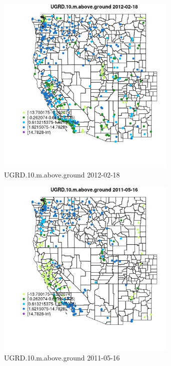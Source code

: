 \begin{figure} 
\centering  
\includegraphics[width=0.77\textwidth]{Code_Outputs/Report_ML_input_PM25_Step4_part_f_de_duplicated_aveswNAs_MapObsUGRD10maboveground2012-02-18.jpg} 
\caption{\label{fig:Report_ML_input_PM25_Step4_part_f_de_duplicated_aveswNAsMapObsUGRD10maboveground2012-02-18}UGRD.10.m.above.ground 2012-02-18} 
\end{figure} 
 

\begin{figure} 
\centering  
\includegraphics[width=0.77\textwidth]{Code_Outputs/Report_ML_input_PM25_Step4_part_f_de_duplicated_aveswNAs_MapObsUGRD10maboveground2011-05-16.jpg} 
\caption{\label{fig:Report_ML_input_PM25_Step4_part_f_de_duplicated_aveswNAsMapObsUGRD10maboveground2011-05-16}UGRD.10.m.above.ground 2011-05-16} 
\end{figure} 
 

